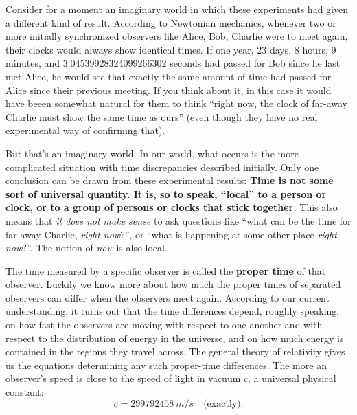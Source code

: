 \documentclass[a4paper,12pt,%
onecolumn,oneside,%
british%
]{memoir}
\renewcommand*{\|}[1][]{\nonscript\:#1\vert\nonscript\:\mathopen{}}
\newcommand*{\yc}{c} %
\begin{document}
Consider for a moment an imaginary world in which these experiments had given a different kind of result. According to Newtonian mechanics, whenever two or more initially synchronized observers like Alice, Bob, Charlie were to meet again, their clocks would always show identical times. If one year, 23 days, 8 hours, 9 minutes, and \num{3.04539928324099266302} seconds had passed for Bob since he last met Alice, he would see that exactly the same amount of time had passed for Alice since their previous meeting. If you think about it, in this case it would have beeen somewhat natural for them to think \enquote{right now, the clock of far-away Charlie must show the same time as ours} (even though they have no real experimental way of confirming that).

But that's an imaginary world. In our world, what occurs is the more complicated situation with time discrepancies described initially. Only one conclusion can be drawn from these experimental results: \textbf{Time is not some sort of universal quantity. It is, so to speak, \enquote{local} to a person or clock, or to a group of persons or clocks that stick together.} This also means that \emph{it does not make sense} to ask questions like \enquote{what can be the time for far-away Charlie, \emph{right now}?}, or \enquote{what is happening at some other place \emph{right now}?}. The notion of \emph{now} is also local.


The time measured by a specific observer is called the \textbf{proper time} of that observer. Luckily we know more about how much the proper times of separated observers can differ when the observers meet again. According to our current understanding, it turns out that the time differences depend, roughly speaking, on how fast the observers are moving with respect to one another and with respect to the distribution of energy in the universe, and on how much energy is contained in the regions they travel across. The general theory of relativity gives us the equations determining any such proper-time differences. The more an observer's speed is close to the speed of light in vacuum $\yc$, a universal physical constant:
%
%
\begin{equation}
  \label{eq:c}
  \yc = \qty{299792458}{m/s}\quad\text{(exactly).}
\end{equation}
\end{document}

